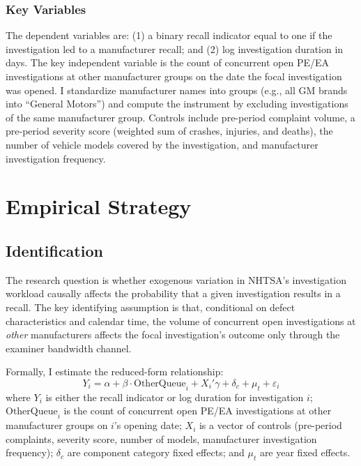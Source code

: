 \documentclass[12pt]{article}
\begin{document}
\subsubsection*{Key Variables} The dependent variables are: (1) a binary recall indicator equal to one if the investigation led to a manufacturer recall; and (2) log investigation duration in days. The key independent variable is the count of concurrent open PE/EA investigations at other manufacturer groups on the date the focal investigation was opened. I standardize manufacturer names into groups (e.g., all GM brands into ``General Motors'') and compute the instrument by excluding investigations of the same manufacturer group. Controls include pre-period complaint volume, a pre-period severity score (weighted sum of crashes, injuries, and deaths), the number of vehicle models covered by the investigation, and manufacturer investigation frequency.



\section{Empirical Strategy}

\subsection{Identification}

The research question is whether exogenous variation in NHTSA's investigation workload causally affects the probability that a given investigation results in a recall. The key identifying assumption is that, conditional on defect characteristics and calendar time, the volume of concurrent open investigations at \textit{other} manufacturers affects the focal investigation's outcome only through the examiner bandwidth channel.

Formally, I estimate the reduced-form relationship:
\begin{equation}
Y_i = \alpha + \beta \cdot \text{OtherQueue}_i + X_i'\gamma + \delta_c + \mu_t + \varepsilon_i
\label{eq:rf}
\end{equation}
where $Y_i$ is either the recall indicator or log duration for investigation $i$; $\text{OtherQueue}_i$ is the count of concurrent open PE/EA investigations at other manufacturer groups on $i$'s opening date; $X_i$ is a vector of controls (pre-period complaints, severity score, number of models, manufacturer investigation frequency); $\delta_c$ are component category fixed effects; and $\mu_t$ are year fixed effects.
\end{document}
